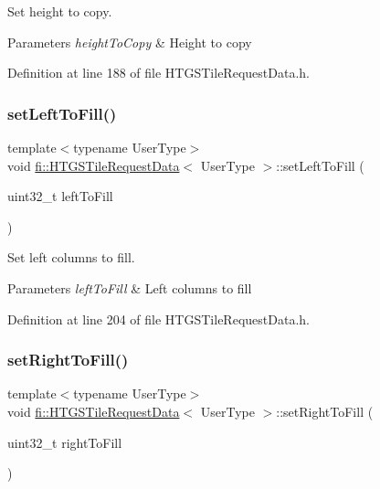 Set height to copy. 


\begin{DoxyParams}{Parameters}
{\em height\+To\+Copy} & Height to copy \\
\hline
\end{DoxyParams}


Definition at line 188 of file H\+T\+G\+S\+Tile\+Request\+Data.\+h.

\mbox{\label{classfi_1_1HTGSTileRequestData_afd11844eed997810eb72b25536be45f7}} 
\subsubsection{\texorpdfstring{set\+Left\+To\+Fill()}{setLeftToFill()}}
{\footnotesize\ttfamily template$<$typename User\+Type$>$ \\
void \hyperlink{classfi_1_1HTGSTileRequestData}{fi\+::\+H\+T\+G\+S\+Tile\+Request\+Data}$<$ User\+Type $>$\+::set\+Left\+To\+Fill (\begin{DoxyParamCaption}\item[{uint32\+\_\+t}]{left\+To\+Fill }\end{DoxyParamCaption})\hspace{0.3cm}{\ttfamily [inline]}}



Set left columns to fill. 


\begin{DoxyParams}{Parameters}
{\em left\+To\+Fill} & Left columns to fill \\
\hline
\end{DoxyParams}


Definition at line 204 of file H\+T\+G\+S\+Tile\+Request\+Data.\+h.

\mbox{\label{classfi_1_1HTGSTileRequestData_af67ee5f1c57cde25ba6aa0d1a3b9fb64}} 
\subsubsection{\texorpdfstring{set\+Right\+To\+Fill()}{setRightToFill()}}
{\footnotesize\ttfamily template$<$typename User\+Type$>$ \\
void \hyperlink{classfi_1_1HTGSTileRequestData}{fi\+::\+H\+T\+G\+S\+Tile\+Request\+Data}$<$ User\+Type $>$\+::set\+Right\+To\+Fill (\begin{DoxyParamCaption}\item[{uint32\+\_\+t}]{right\+To\+Fill }\end{DoxyParamCaption})\hspace{0.3cm}{\ttfamily [inline]}}



